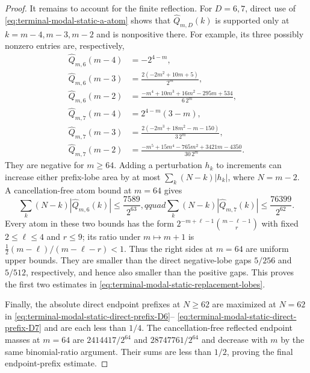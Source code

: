 \begin{proof}
It remains to account for the finite reflection.  For $D=6,7$, direct use
of \eqref{eq:terminal-modal-static-a-atom} shows that
$\widehat Q_{m,D}(k)$ is supported only at
$k=m-4,m-3,m-2$ and is nonpositive there.  For example, its three possibly
nonzero entries are, respectively,
\begin{align*}
 \widehat Q_{m,6}(m-4)&=-2^{4-m},\\
 \widehat Q_{m,6}(m-3)&=\frac{2(-2m^2+10m+5)}{2^m},\\
 \widehat Q_{m,6}(m-2)&=
 \frac{-m^4+10m^3+16m^2-295m+534}{6\,2^m},\\
 \widehat Q_{m,7}(m-4)&=2^{4-m}(3-m),\\
 \widehat Q_{m,7}(m-3)&=
 \frac{2(-2m^3+18m^2-m-150)}{3\,2^m},\\
 \widehat Q_{m,7}(m-2)&=
 \frac{-m^5+15m^4-765m^2+3421m-4350}{30\,2^m}.
\end{align*}
They are negative for $m\ge64$.  Adding a perturbation $h_k$ to increments
can increase either prefix-lobe area by at most
$\sum_k(N-k)|h_k|$, where $N=m-2$.  A cancellation-free atom bound at
$m=64$ gives
\begin{equation}
 \sum_k(N-k)|\widehat Q_{m,6}(k)|
 \le\frac{7589}{2^{63}},qquad
 \sum_k(N-k)|\widehat Q_{m,7}(k)|
 \le\frac{76399}{2^{62}}.
 \label{eq:terminal-modal-static-D67-reflection-area}
\end{equation}
Every atom in these two bounds has the form
$2^{-m+\ell-1}\binom{m-\ell-1}{r}$ with fixed
$2\le\ell\le4$ and $r\le9$; its ratio under $m\mapsto m+1$ is
$\frac12(m-\ell)/(m-\ell-r)<1$.  Thus the right sides at $m=64$ are
uniform upper bounds.  They are smaller than the direct negative-lobe gaps
$5/256$ and $5/512$, respectively, and hence also smaller than the positive
gaps.  This proves the first two estimates in
\eqref{eq:terminal-modal-static-replacement-lobes}.

Finally, the absolute direct endpoint prefixes at $N\ge62$ are maximized at
$N=62$ in \eqref{eq:terminal-modal-static-direct-prefix-D6}--
\eqref{eq:terminal-modal-static-direct-prefix-D7} and are each less than
$1/4$.  The cancellation-free reflected endpoint masses at $m=64$ are
$2414417/2^{64}$ and $28747761/2^{64}$ and decrease with $m$ by the same
binomial-ratio argument.  Their sums are less than $1/2$, proving the final
endpoint-prefix estimate.
\end{proof}

